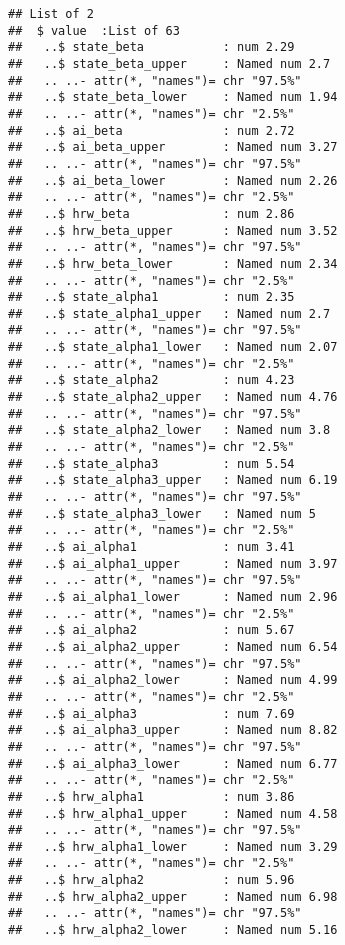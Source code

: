 \documentclass[12pt,letterpaper,leqno]{article}\usepackage[]{graphicx}\usepackage[]{color}
\makeatletter
\newenvironment{kframe}{%
 \def\at@end@of@kframe{}%
 \ifinner\ifhmode%
  \def\at@end@of@kframe{\end{minipage}}%
  \begin{minipage}{\columnwidth}%
 \fi\fi%
 \def\FrameCommand##1{\hskip\@totalleftmargin \hskip-\fboxsep
 \colorbox{shadecolor}{##1}\hskip-\fboxsep
     \hskip-\linewidth \hskip-\@totalleftmargin \hskip\columnwidth}%
 \MakeFramed {\advance\hsize-\width
   \@totalleftmargin\z@ \linewidth\hsize
   \@setminipage}}%
 {\par\unskip\endMakeFramed%
 \at@end@of@kframe}
\newenvironment{knitrout}{}{} %
\makeatother
\begin{document}
\begin{knitrout}
\color{fgcolor}\begin{kframe}
\begin{verbatim}
## List of 2
##  $ value  :List of 63
##   ..$ state_beta           : num 2.29
##   ..$ state_beta_upper     : Named num 2.7
##   .. ..- attr(*, "names")= chr "97.5%"
##   ..$ state_beta_lower     : Named num 1.94
##   .. ..- attr(*, "names")= chr "2.5%"
##   ..$ ai_beta              : num 2.72
##   ..$ ai_beta_upper        : Named num 3.27
##   .. ..- attr(*, "names")= chr "97.5%"
##   ..$ ai_beta_lower        : Named num 2.26
##   .. ..- attr(*, "names")= chr "2.5%"
##   ..$ hrw_beta             : num 2.86
##   ..$ hrw_beta_upper       : Named num 3.52
##   .. ..- attr(*, "names")= chr "97.5%"
##   ..$ hrw_beta_lower       : Named num 2.34
##   .. ..- attr(*, "names")= chr "2.5%"
##   ..$ state_alpha1         : num 2.35
##   ..$ state_alpha1_upper   : Named num 2.7
##   .. ..- attr(*, "names")= chr "97.5%"
##   ..$ state_alpha1_lower   : Named num 2.07
##   .. ..- attr(*, "names")= chr "2.5%"
##   ..$ state_alpha2         : num 4.23
##   ..$ state_alpha2_upper   : Named num 4.76
##   .. ..- attr(*, "names")= chr "97.5%"
##   ..$ state_alpha2_lower   : Named num 3.8
##   .. ..- attr(*, "names")= chr "2.5%"
##   ..$ state_alpha3         : num 5.54
##   ..$ state_alpha3_upper   : Named num 6.19
##   .. ..- attr(*, "names")= chr "97.5%"
##   ..$ state_alpha3_lower   : Named num 5
##   .. ..- attr(*, "names")= chr "2.5%"
##   ..$ ai_alpha1            : num 3.41
##   ..$ ai_alpha1_upper      : Named num 3.97
##   .. ..- attr(*, "names")= chr "97.5%"
##   ..$ ai_alpha1_lower      : Named num 2.96
##   .. ..- attr(*, "names")= chr "2.5%"
##   ..$ ai_alpha2            : num 5.67
##   ..$ ai_alpha2_upper      : Named num 6.54
##   .. ..- attr(*, "names")= chr "97.5%"
##   ..$ ai_alpha2_lower      : Named num 4.99
##   .. ..- attr(*, "names")= chr "2.5%"
##   ..$ ai_alpha3            : num 7.69
##   ..$ ai_alpha3_upper      : Named num 8.82
##   .. ..- attr(*, "names")= chr "97.5%"
##   ..$ ai_alpha3_lower      : Named num 6.77
##   .. ..- attr(*, "names")= chr "2.5%"
##   ..$ hrw_alpha1           : num 3.86
##   ..$ hrw_alpha1_upper     : Named num 4.58
##   .. ..- attr(*, "names")= chr "97.5%"
##   ..$ hrw_alpha1_lower     : Named num 3.29
##   .. ..- attr(*, "names")= chr "2.5%"
##   ..$ hrw_alpha2           : num 5.96
##   ..$ hrw_alpha2_upper     : Named num 6.98
##   .. ..- attr(*, "names")= chr "97.5%"
##   ..$ hrw_alpha2_lower     : Named num 5.16

\end{verbatim}
\end{kframe}
\end{knitrout}
\end{document}
